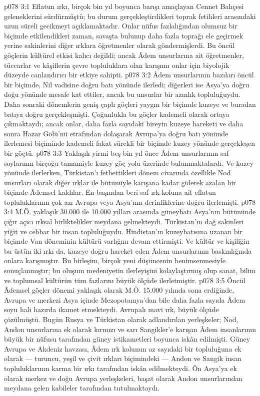 \vs p078 3:1 Eflatun ırkı, birçok bin yıl boyunca barışı amaçlayan Cennet Bahçesi geleneklerini sürdürmüştü; bu durum gerçekleştirdikleri toprak fetihleri arasındaki uzun süreli gecikmeyi açıklamaktadır. Onlar nüfus fazlalığından olumsuz bir biçimde etkilendikleri zaman, savaşta bulunup daha fazla toprağı ele geçirmek yerine sakinlerini diğer ırklara öğretmenler olarak göndermişlerdi. Bu öncül göçlerin kültürel etkisi kalıcı değildi; ancak Âdem unsurlarına ait öğretmenler, tüccarlar ve kâşiflerin çevre topluluklara olan karışımı onlar için biyolojik düzeyde canlandırıcı bir etkiye sahipti.
\vs p078 3:2 Âdem unsurlarının bazıları öncül bir biçimde, Nil vadisine doğru batı yönünde ilerledi; diğerleri ise Asya’ya doğru doğu yönünde mesafe kat ettiler, ancak bu unsurlar bir azınlık topluluğuydu. Daha sonraki dönemlerin geniş çaplı göçleri yaygın bir biçimde kuzeye ve buradan batıya doğru gerçekleşmişti. Çoğunlukla bu göçler kademeli olarak ortaya çıkmaktaydı; ancak onlar, daha fazla sayıdaki bireyin kuzeye hareketi ve daha sonra Hazar Gölü’nü etrafından dolaşarak Avrupa’ya doğru batı yönünde ilerlemesi biçiminde kademeli fakat sürekli bir biçimde kuzey yönünde gerçekleşen bir göçtü.
\vs p078 3:3 Yaklaşık yirmi beş bin yıl önce Âdem unsurlarının saf soylarının birçoğu tamamiyle kuzey göç yolu üzerinde bulunmaktalardı. Ve kuzey yönünde ilerlerken, Türkistan’ı fethettikleri dönem civarında özellikle Nod unsurları olarak diğer ırklar ile bütünüyle karışana kadar giderek azalan bir biçimde Âdemsel kaldılar. En başından beri saf ırk koluna ait eflatun topluluklarının çok azı Avrupa veya Asya’nın derinliklerine doğru ilerlemişti.
\vs p078 3:4 M.Ö. yaklaşık 30.000 ile 10.000 yılları arasında güneybatı Asya’nın bütününde çığır açıcı ırksal birliktelikler meydana gelmekteydi. Türkistan’ın dağ sakinleri yiğit ve cebbar bir insan topluluğuydu. Hindistan’ın kuzeybatısına uzanan bir biçimde Van döneminin kültürü varlığını devam ettirmişti. Ve kültür ve kişiliğin bu üstün iki ırkı da, kuzeye doğru hareket eden Âdem unsurlarının baskınlığında onlara karışmıştır. Bu birleşim, birçok yeni düşüncenin benimsenmesiyle sonuçlanmıştır; bu oluşum medeniyetin ilerleyişini kolaylaştırmış olup sanat, bilim ve toplumsal kültürün tüm fazlarını büyük ölçüde ilerletmiştir.
\vs p078 3:5 Öncül Âdemsel göçler dönemi yaklaşık olarak M.Ö. 15.000 yılında sona erdiğinde, Avrupa ve merkezi Asya içinde Mezopotamya’dan bile daha fazla sayıda Âdem soyu hali hazırda ikamet etmekteydi. Avrupalı mavi ırk, büyük ölçüde çözülmüştü. Bugün Rusya ve Türkistan olarak adlandırılan yerleşkeler; Nod, Andon unsurlarına ek olarak kırmızı ve sarı Sangikler’e karışan Âdem insanlarının büyük bir nüfusu tarafından güney istikametleri boyunca iskân edilmişti. Güney Avrupa ve Akdeniz havzası, Âdem ırk kolunun az sayıdaki bir topluluğuna ek olarak --- turuncu, yeşil ve çivit ırkları biçimindeki --- Andon ve Sangik insan topluluklarının karma bir ırkı tarafından iskân edilmekteydi. Ön Asya’ya ek olarak merkez ve doğu Avrupa yerleşkeleri, başat olarak Andon unsurlarından meydana gelen kabileler tarafından tutulmaktaydı.
